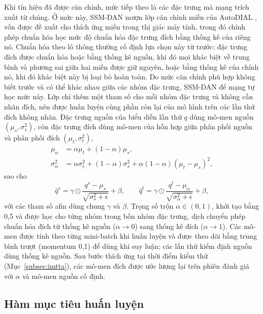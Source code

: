 \documentclass[preprint,12pt]{elsarticle}
\begin{document}
Khi tín hiệu đã được căn chỉnh, mức tiếp theo là các đặc trưng mà mạng trích xuất từ chúng. Ở mức này, SSM-DAN mượn lớp căn chỉnh miền của AutoDIAL \cite{carlucci2017autodial}, vốn được đề xuất cho thích ứng miền trong thị giác máy tính, trong đó chính phép chuẩn hóa học mức độ chuẩn hóa đặc trưng đích bằng thống kê của riêng nó. Chuẩn hóa theo lô thông thường cố định lựa chọn này từ trước: đặc trưng đích được chuẩn hóa hoặc bằng thống kê nguồn, khi đó mọi khác biệt về trung bình và phương sai giữa hai miền được giữ nguyên, hoặc bằng thống kê của chính nó, khi đó khác biệt này bị loại bỏ hoàn toàn. Do mức căn chỉnh phù hợp không biết trước và có thể khác nhau giữa các nhóm đặc trưng, SSM-DAN để mạng tự học mức này. Lớp chỉ thêm một tham số cho mỗi nhóm đặc trưng và không cần nhãn đích, nên được huấn luyện cùng phần còn lại của mô hình trên các lần thử đích không nhãn. Đặc trưng nguồn của biểu diễn lần thử $q$ dùng mô-men nguồn $(\mu_s,\sigma_s^2)$, còn đặc trưng đích dùng mô-men của hỗn hợp giữa phân phối nguồn và phân phối đích $(\mu_t,\sigma_t^2)$,
\begin{align}
    \mu_\alpha &= \alpha\mu_t+(1-\alpha)\mu_s, \\
    \sigma_\alpha^2 &= \alpha\sigma_t^2+(1-\alpha)\sigma_s^2+\alpha(1-\alpha)(\mu_t-\mu_s)^2,
\end{align}
sao cho
\begin{equation}
    \hat{q}^s = \gamma\odot\frac{q^s-\mu_s}{\sqrt{\sigma_s^2+\epsilon}}+\beta, \qquad
    \hat{q}^t = \gamma\odot\frac{q^t-\mu_\alpha}{\sqrt{\sigma_\alpha^2+\epsilon}}+\beta ,
\end{equation}
với các tham số afin dùng chung $\gamma$ và $\beta$. Trọng số trộn $\alpha\in(0,1)$, khởi tạo bằng 0,5 và được học cho từng nhóm trong bốn nhóm đặc trưng, dịch chuyển phép chuẩn hóa đích từ thống kê nguồn ($\alpha\rightarrow0$) sang thống kê đích ($\alpha\rightarrow1$). Các mô-men được tính theo từng mini-batch khi huấn luyện và được theo dõi bằng trung bình trượt (momentum 0,1) để dùng khi suy luận; các lần thử kiểm định nguồn dùng thống kê nguồn. Sau bước thích ứng tại thời điểm kiểm thử (Mục~\ref{subsec:imtta}), các mô-men đích được ước lượng lại trên phiên đánh giá với $\alpha$ và mô-men nguồn cố định.

\subsection{Hàm mục tiêu huấn luyện}
\label{subsec:uda}
\end{document}
